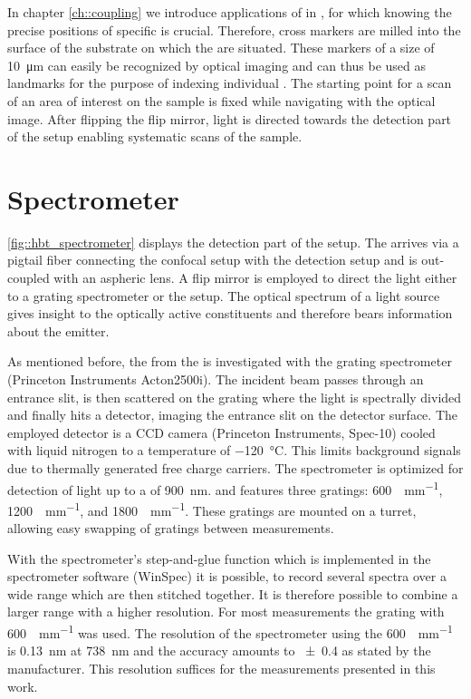 		In chapter \autoref{ch::coupling} we introduce applications of \sivs in \nds, for which knowing the precise positions of specific \nds is crucial.
		Therefore, cross markers are milled into the surface of the substrate on which the \nds are situated.
		These markers of a size of \SI{10}{\micro\meter} can easily be recognized by optical imaging and can thus be used as landmarks for the purpose of indexing individual \sivs.
		The starting point for a scan of an area of interest on the sample is fixed while navigating with the optical image.
		After flipping the flip mirror, light is directed towards the detection part of the setup enabling systematic scans of the sample.

	\section{Spectrometer} \label{sec::methods_spectrometer}

		\autoref{fig::hbt_spectrometer} displays the detection part of the setup.
		The \fl arrives via a pigtail fiber connecting the confocal setup with the detection setup and is out-coupled with an aspheric lens.
		A flip mirror is employed to direct the light either to a grating spectrometer or the \hbt setup.
		The optical spectrum of a light source gives insight to the optically active constituents and therefore bears information about the emitter.

		As mentioned before, the \fl from the \sivs is investigated with the grating spectrometer (Princeton Instruments Acton2500i).
		The incident beam passes through an entrance slit, is then scattered on the grating where the light is spectrally divided and finally hits a detector, imaging the entrance slit on the detector surface.
		The employed detector is a CCD camera (Princeton Instruments, Spec-10) cooled with liquid nitrogen to a temperature of \SI{-120}{\celsius}. This limits background signals due to thermally generated free charge carriers.
		The spectrometer is optimized for detection of light up to a \wl of \SI{900}{nm}.
		and features three gratings: \SI[per-mode=symbol]{600}{\lines\per\mm}, \SI[per-mode=symbol]{1200}{\lines\per\mm}, and \SI[per-mode=symbol]{1800}{\lines\per\mm}.
		These gratings are mounted on a turret, allowing easy swapping of gratings between measurements.

		With the spectrometer's step-and-glue function which is implemented in the spectrometer software (WinSpec) it is possible, to record several spectra over a wide \wl range which are then stitched together.
		It is therefore possible to combine a larger \wl range with a higher resolution.
		For most measurements the grating with \SI[per-mode=symbol]{600}{\lines\per\mm} was used.
		The resolution of the spectrometer using the \SI{600}{\lines\per\mm} is \SI{0.13}{nm} at \SI{738}{nm} and the accuracy amounts to \num{\pm0.4} as stated by the manufacturer.
		This resolution suffices for the measurements presented in this work.


